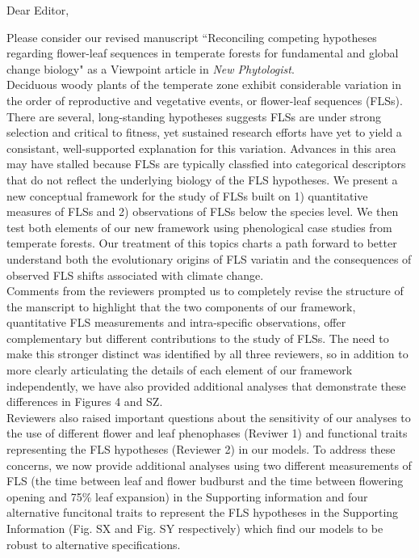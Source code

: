 \documentclass{article}[11pt]
\begin{document}
Dear Editor,

\noindent Please consider our revised manuscript ``Reconciling competing hypotheses regarding flower-leaf sequences in temperate forests for fundamental and global change biology" as a Viewpoint article in \emph{New Phytologist}.\\

\noindent Deciduous woody plants of the temperate zone exhibit considerable variation in the order of reproductive and vegetative events, or flower-leaf sequences (FLSs). There are several, long-standing hypotheses suggests FLSs are under strong selection and critical to fitness, yet sustained research efforts have yet to yield a consistant, well-supported explanation for this variation. Advances in this area may have stalled because FLSs are typically classfied into categorical descriptors that do not reflect the underlying biology of the FLS hypotheses. We present a new conceptual framework for the study of  FLSs built on 1) quantitative measures of FLSs and 2) observations of FLSs below the species level. We then test both elements of our new framework using phenological case studies from temperate forests. Our treatment of this topics charts a path forward to better understand both the evolutionary origins of FLS variatin and the consequences of observed FLS shifts associated with climate change.\\

\noindent Comments from the reviewers prompted us to completely revise the structure of the manscript to highlight that the two components of our framework, quantitative FLS measurements and intra-specific observations, offer complementary but different contributions to the study of FLSs. The need to make this stronger distinct was identified by all three reviewers, so in addition to more clearly articulating the details of each element of our framework independently, we have also provided additional analyses that demonstrate these differences in Figures 4 and SZ.\\

\noindent Reviewers also raised important questions about the sensitivity of our analyses to the use of different flower and leaf phenophases (Reviwer 1) and functional traits representing the FLS hypotheses (Reviewer 2) in our models. To address these concerns, we now provide additional analyses using two different measurements of FLS (the time between leaf and flower budburst and the time between flowering opening and 75\% leaf expansion) in the Supporting information and four alternative funcitonal traits to represent the FLS hypotheses in the Supporting Information (Fig. SX and Fig. SY respectively) which find our models to be robust to alternative specifications.\\
\end{document}
